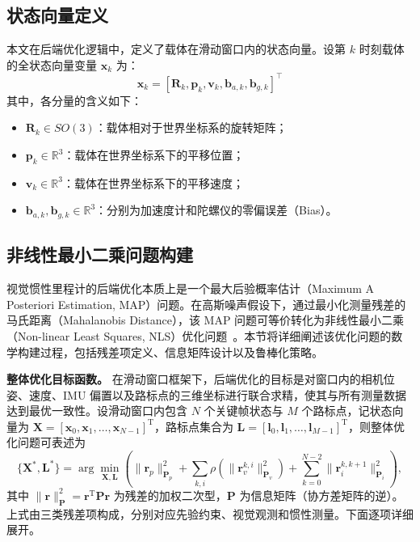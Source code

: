 \subsection{状态向量定义}

本文在后端优化逻辑中，定义了载体在滑动窗口内的状态向量。设第 $k$ 时刻载体的全状态向量变量 $\mathbf{x}_k$ 为：
\begin{equation}
    \mathbf{x}_k = [\mathbf{R}_k, \mathbf{p}_k, \mathbf{v}_k, \mathbf{b}_{a,k}, \mathbf{b}_{g,k}]^\top
\end{equation}
其中，各分量的含义如下：
\begin{itemize}
    \item $\mathbf{R}_k \in SO(3)$：载体相对于世界坐标系的旋转矩阵；
    \item $\mathbf{p}_k \in \mathbb{R}^3$：载体在世界坐标系下的平移位置；
    \item $\mathbf{v}_k \in \mathbb{R}^3$：载体在世界坐标系下的平移速度；
    \item $\mathbf{b}_{a,k}, \mathbf{b}_{g,k} \in \mathbb{R}^3$：分别为加速度计和陀螺仪的零偏误差（Bias）。
\end{itemize}

\subsection{非线性最小二乘问题构建}

视觉惯性里程计的后端优化本质上是一个最大后验概率估计（Maximum A Posteriori Estimation, MAP）问题。在高斯噪声假设下，通过最小化测量残差的马氏距离（Mahalanobis Distance），该 MAP 问题可等价转化为非线性最小二乘（Non-linear Least Squares, NLS）优化问题~\cite{triggs1999bundle}。本节将详细阐述该优化问题的数学构建过程，包括残差项定义、信息矩阵设计以及鲁棒化策略。

\textbf{整体优化目标函数。}
在滑动窗口框架下，后端优化的目标是对窗口内的相机位姿、速度、IMU 偏置以及路标点的三维坐标进行联合求精，使其与所有测量数据达到最优一致性。设滑动窗口内包含 $N$ 个关键帧状态与 $M$ 个路标点，记状态向量为 $\mathbf{X}=[\mathbf{x}_0,\mathbf{x}_1,\dots,\mathbf{x}_{N-1}]^{\mathrm{T}}$，路标点集合为 $\mathbf{L}=[\mathbf{l}_0,\mathbf{l}_1,\dots,\mathbf{l}_{M-1}]^{\mathrm{T}}$，则整体优化问题可表述为
\begin{equation}
    \{\mathbf{X}^*,\mathbf{L}^*\} = \arg \min_{\mathbf{X},\mathbf{L}} \left( \|\mathbf{r}_p\|^2_{\mathbf{P}_p} + \sum_{k,i} \rho\!\left(\|\mathbf{r}_{v}^{k,i}\|^2_{\mathbf{P}_v}\right) + \sum_{k=0}^{N-2} \|\mathbf{r}_{i}^{k,k+1}\|^2_{\mathbf{P}_i} \right),
\end{equation}
其中 $\|\mathbf{r}\|^2_{\mathbf{P}}=\mathbf{r}^{\mathrm{T}}\mathbf{P}\mathbf{r}$ 为残差的加权二次型，$\mathbf{P}$ 为信息矩阵（协方差矩阵的逆）。上式由三类残差项构成，分别对应先验约束、视觉观测和惯性测量。下面逐项详细展开。

